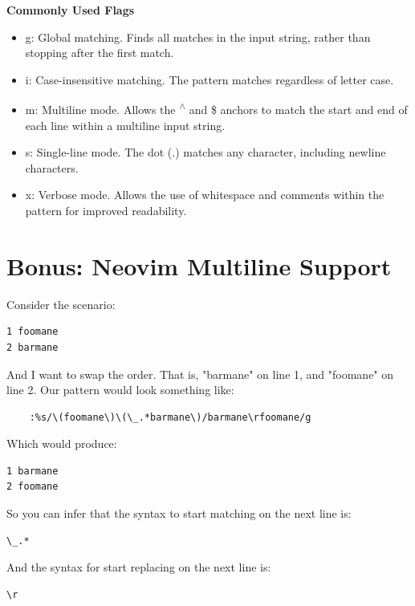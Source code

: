 \documentclass{report}
\begin{document}
    \bigbreak \noindent 
    \textbf{Commonly Used Flags}
    \begin{itemize}
        \item g: Global matching. Finds all matches in the input string, rather than stopping after the first match.
        \item i: Case-insensitive matching. The pattern matches regardless of letter case.
        \item m: Multiline mode. Allows the \textsuperscript{$\wedge$} and \$ anchors to match the start and end of each line within a multiline input string.
        \item s: Single-line mode. The dot (.) matches any character, including newline characters.
        \item x: Verbose mode. Allows the use of whitespace and comments within the pattern for improved readability.
    \end{itemize}

    \bigbreak \noindent 
    

    \pagebreak \bigbreak \noindent
    \section{Bonus: Neovim Multiline Support}
    \bigbreak \noindent 
    Consider the scenario:
    \begin{verbatim}
1 foomane
2 barmane
    \end{verbatim}
    \bigbreak \noindent 
    And I want to swap the order. That is, "barmane" on line 1, and "foomane" on line 2. Our pattern would look something like:
    \begin{verbatim}
    :%s/\(foomane\)\(\_.*barmane\)/barmane\rfoomane/g
    \end{verbatim}
    \bigbreak \noindent 
    Which would produce:
    \begin{verbatim}
1 barmane
2 foomane
    \end{verbatim}
    So you can infer that the syntax to start matching on the next line is:
    \begin{verbatim}
\_.*
    \end{verbatim}
    And the syntax for start replacing on the next line is:
    \begin{verbatim}
\r
    \end{verbatim}
    \bigbreak \noindent 




    
\end{document}

